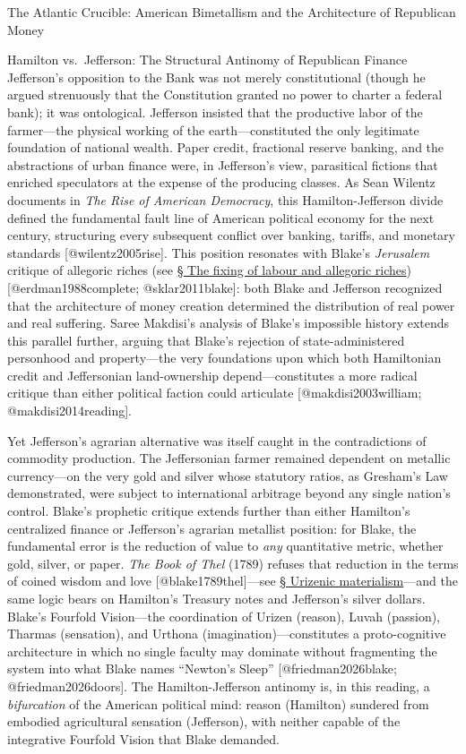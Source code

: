 \documentclass[
  ignorenonframetext,
]{beamer}
\begin{document}
\begin{frame}{The Atlantic Crucible: American Bimetallism and the
Architecture of Republican Money}
\begin{block}{Hamilton vs.~Jefferson: The Structural Antinomy of
Republican Finance}
Jefferson's opposition to the Bank was not merely constitutional (though
he argued strenuously that the Constitution granted no power to charter
a federal bank); it was ontological. Jefferson insisted that the
productive labor of the farmer---the physical working of the
earth---constituted the only legitimate foundation of national wealth.
Paper credit, fractional reserve banking, and the abstractions of urban
finance were, in Jefferson's view, parasitical fictions that enriched
speculators at the expense of the producing classes. As Sean Wilentz
documents in \emph{The Rise of American Democracy}, this
Hamilton-Jefferson divide defined the fundamental fault line of American
political economy for the next century, structuring every subsequent
conflict over banking, tariffs, and monetary standards
{[}@wilentz2005rise{]}. This position resonates with Blake's
\emph{Jerusalem} critique of allegoric riches (see
\hyperlink{sec-allegoric-riches}{§ The fixing of labour and allegoric
riches}) {[}@erdman1988complete; @sklar2011blake{]}: both Blake and
Jefferson recognized that the architecture of money creation determined
the distribution of real power and real suffering. Saree Makdisi's
analysis of Blake's impossible history extends this parallel further,
arguing that Blake's rejection of state-administered personhood and
property---the very foundations upon which both Hamiltonian credit and
Jeffersonian land-ownership depend---constitutes a more radical critique
than either political faction could articulate {[}@makdisi2003william;
@makdisi2014reading{]}.

Yet Jefferson's agrarian alternative was itself caught in the
contradictions of commodity production. The Jeffersonian farmer remained
dependent on metallic currency---on the very gold and silver whose
statutory ratios, as Gresham's Law demonstrated, were subject to
international arbitrage beyond any single nation's control. Blake's
prophetic critique extends further than either Hamilton's centralized
finance or Jefferson's agrarian metallist position: for Blake, the
fundamental error is the reduction of value to \emph{any} quantitative
metric, whether gold, silver, or paper. \emph{The Book of Thel} (1789)
refuses that reduction in the terms of coined wisdom and love
{[}@blake1789thel{]}---see \hyperlink{sec-urizenic-materialism}{§
Urizenic materialism}---and the same logic bears on Hamilton's Treasury
notes and Jefferson's silver dollars. Blake's Fourfold Vision---the
coordination of Urizen (reason), Luvah (passion), Tharmas (sensation),
and Urthona (imagination)---constitutes a proto-cognitive architecture
in which no single faculty may dominate without fragmenting the system
into what Blake names ``Newton's Sleep'' {[}@friedman2026blake;
@friedman2026doors{]}. The Hamilton-Jefferson antinomy is, in this
reading, a \emph{bifurcation} of the American political mind: reason
(Hamilton) sundered from embodied agricultural sensation (Jefferson),
with neither capable of the integrative Fourfold Vision that Blake
demanded.
\end{block}
\end{frame}
\end{document}
